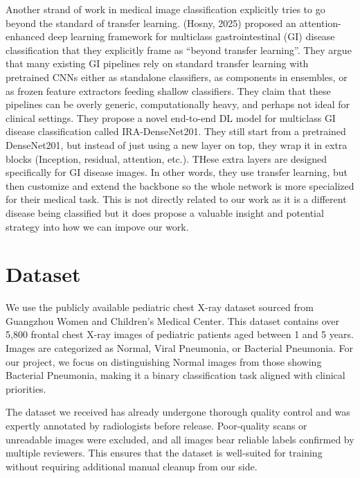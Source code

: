 \documentclass[11pt]{article}
\begin{document}
Another strand of work in medical image classification explicitly tries to go beyond the standard of transfer learning. (Hosny, 2025) proposed an attention-enhanced deep learning framework for multiclass gastrointestinal (GI) disease classification that they explicitly frame as “beyond transfer learning”. They argue that many existing GI pipelines rely on standard transfer learning with pretrained CNNs either as standalone classifiers, as components in ensembles, or as frozen feature extractors feeding shallow classifiers. They claim that these pipelines can be overly generic, computationally heavy, and perhaps not ideal for clinical settings. They propose a novel end-to-end DL model for multiclass GI disease classification called IRA-DenseNet201. They still start from a pretrained DenseNet201, but instead of just using a new layer on top, they wrap it in extra blocks (Inception, residual, attention, etc.). THese extra layers are designed specifically for GI disease images. In other words, they use transfer learning, but then customize and extend the backbone so the whole network is more specialized for their medical task. This is not directly related to our work as it is a different disease being classified but it does propose a valuable insight and potential strategy into how we can impove our work.

\section{Dataset}


We use the publicly available pediatric chest X-ray dataset sourced from Guangzhou Women and Children’s Medical Center. This dataset contains over 5,800 frontal chest X-ray images of pediatric patients aged between 1 and 5 years. Images are categorized as Normal, Viral Pneumonia, or Bacterial Pneumonia. For our project, we focus on distinguishing Normal images from those showing Bacterial Pneumonia, making it a binary classification task aligned with clinical priorities.

The dataset we received has already undergone thorough quality control and was expertly annotated by radiologists before release. Poor-quality scans or unreadable images were excluded, and all images bear reliable labels confirmed by multiple reviewers. This ensures that the dataset is well-suited for training without requiring additional manual cleanup from our side.
\end{document}

